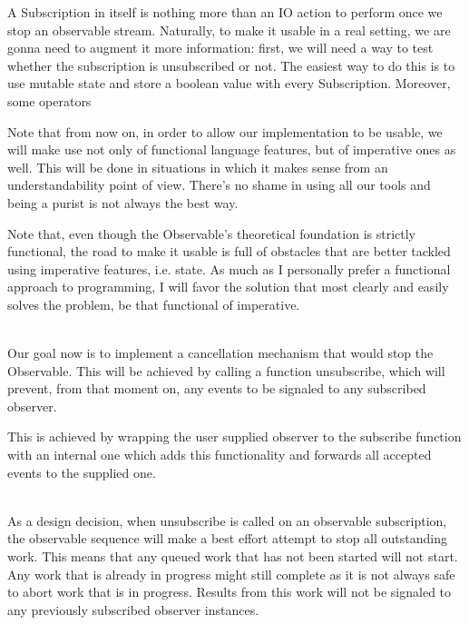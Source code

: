 
A Subscription in itself is nothing more than an IO action to perform once we stop an observable stream. Naturally, to make it usable in a real setting, we are gonna need to augment it more information: first, we will need a way to test whether the subscription is unsubscribed or not. The easiest way to do this is to use mutable state and store a boolean value with every Subscription. Moreover, some operators 

Note that from now on, in order to allow our implementation to be usable, we will make use not only of functional language features, but of imperative ones as well. This will be done in situations in which it makes sense from an understandability point of view. There's no shame in using all our tools and being a purist is not always the best way.

Note that, even though the Observable's theoretical foundation is strictly functional, the road to make it usable is full of obstacles that are better tackled using imperative features, i.e. state. As much as I personally prefer a functional approach to programming, I will favor the solution that most clearly and easily solves the problem, be that functional of imperative.

\\

Our goal now is to implement a cancellation mechanism that would stop the Observable. This will be achieved by calling a function unsubscribe, which will prevent, from that moment on, any events to be signaled to any subscribed observer.

This is achieved by wrapping the user supplied observer to the subscribe function with an internal one which adds this functionality and forwards all accepted events to the supplied one.

\\

As a design decision, when unsubscribe is called on an observable subscription, the observable sequence will make a best effort attempt to stop all outstanding work. This means that any queued work that has not been started will not start. Any work that is already in progress might still complete as it is not always safe to abort work that is in progress. Results from this work will not be signaled to any previously subscribed observer instances.


